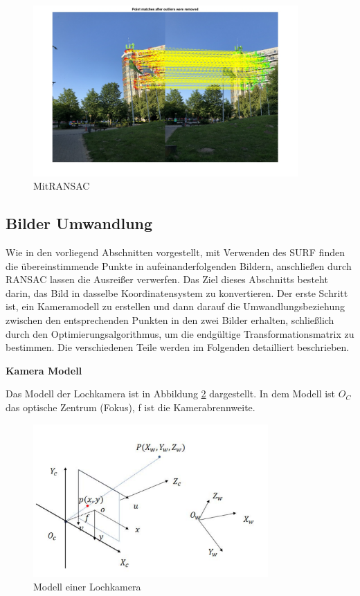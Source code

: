 \begin{figure}[H]
 \centering 
 \includegraphics[keepaspectratio,width=0.9\textwidth]{images/4_ZweiteErfahrung/RANSAC/MitRANSAC.pdf}
 \caption{MitRANSAC}
 \label{fig:MitRANSAC}
\end{figure} 


\subsection{Bilder Umwandlung}

Wie in den vorliegend Abschnitten vorgestellt, mit Verwenden des SURF finden die übereinstimmende Punkte in aufeinanderfolgenden Bildern, anschließen durch RANSAC lassen die Ausreißer verwerfen. Das Ziel dieses Abschnitts besteht darin, das Bild in dasselbe Koordinatensystem zu konvertieren. Der erste Schritt ist, ein Kameramodell zu erstellen und dann darauf die Umwandlungsbeziehung zwischen den entsprechenden Punkten in den zwei Bilder erhalten, schließlich durch den Optimierungsalgorithmus, um die endgültige Transformationsmatrix zu bestimmen. Die verschiedenen Teile werden im Folgenden detailliert beschrieben.

\textbf{Kamera Modell}

Das Modell der Lochkamera ist in Abbildung \ref{fig:cameramodel} dargestellt. In dem Modell ist $O_C$ das optische Zentrum (Fokus), f ist die Kamerabrennweite.

\begin{figure}[htb]
 \centering 
 \includegraphics[keepaspectratio,width=0.8\textwidth]{images/4_ZweiteErfahrung/Kamera/cameramodel.pdf}
 \caption{Modell einer Lochkamera}
 \label{fig:cameramodel}
\end{figure} 

